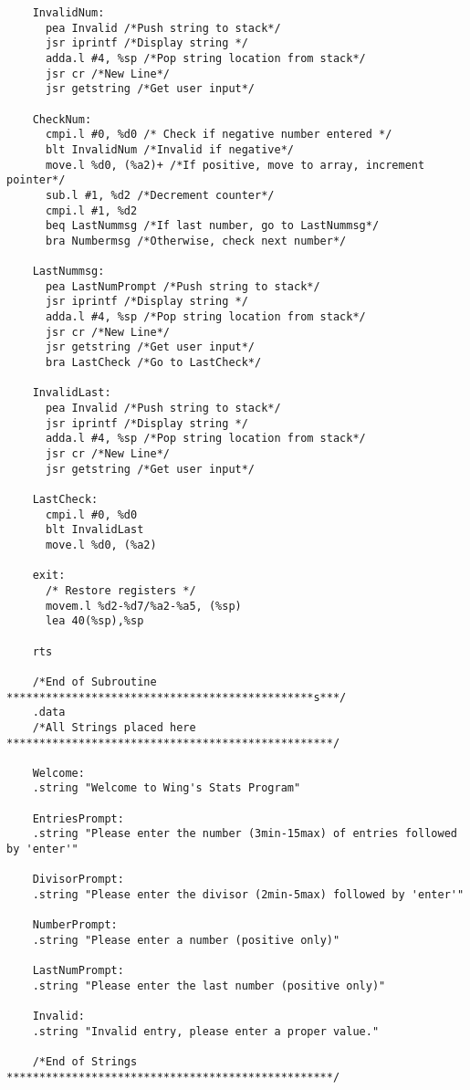 \documentclass[10pt, letterpaper, titlepage]{article} %
\begin{document}
\begin{lstlisting}
	InvalidNum:
	  pea Invalid /*Push string to stack*/
	  jsr iprintf /*Display string */
	  adda.l #4, %sp /*Pop string location from stack*/
	  jsr cr /*New Line*/
	  jsr getstring /*Get user input*/
	
	CheckNum:
	  cmpi.l #0, %d0 /* Check if negative number entered */
	  blt InvalidNum /*Invalid if negative*/
	  move.l %d0, (%a2)+ /*If positive, move to array, increment pointer*/
	  sub.l #1, %d2 /*Decrement counter*/
	  cmpi.l #1, %d2
	  beq LastNummsg /*If last number, go to LastNummsg*/
	  bra Numbermsg /*Otherwise, check next number*/
	
	LastNummsg:
	  pea LastNumPrompt /*Push string to stack*/
	  jsr iprintf /*Display string */
	  adda.l #4, %sp /*Pop string location from stack*/
	  jsr cr /*New Line*/
	  jsr getstring /*Get user input*/
	  bra LastCheck /*Go to LastCheck*/
	
	InvalidLast:
	  pea Invalid /*Push string to stack*/
	  jsr iprintf /*Display string */
	  adda.l #4, %sp /*Pop string location from stack*/
	  jsr cr /*New Line*/
	  jsr getstring /*Get user input*/
	
	LastCheck:
	  cmpi.l #0, %d0
	  blt InvalidLast
	  move.l %d0, (%a2)
	
	exit:
	  /* Restore registers */
	  movem.l %d2-%d7/%a2-%a5, (%sp)
	  lea 40(%sp),%sp
	
	rts
	
	/*End of Subroutine ***********************************************s***/
	.data
	/*All Strings placed here **************************************************/
	
	Welcome:
	.string "Welcome to Wing's Stats Program"
	
	EntriesPrompt:
	.string "Please enter the number (3min-15max) of entries followed by 'enter'"
	
	DivisorPrompt:
	.string "Please enter the divisor (2min-5max) followed by 'enter'"
	
	NumberPrompt:
	.string "Please enter a number (positive only)"
	
	LastNumPrompt:
	.string "Please enter the last number (positive only)"
	
	Invalid:
	.string "Invalid entry, please enter a proper value."
	
	/*End of Strings **************************************************/
\end{lstlisting}
\end{document}
